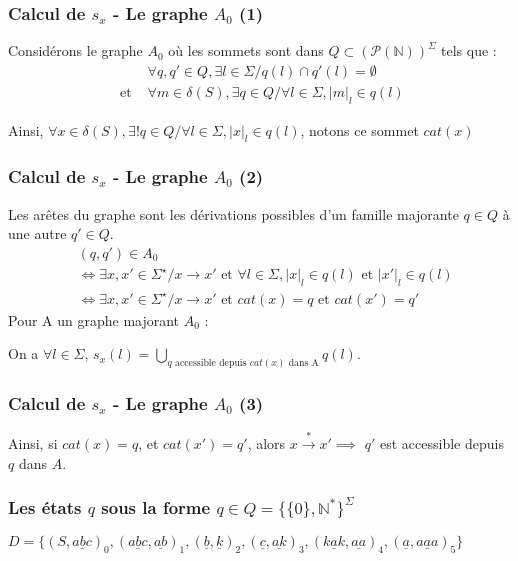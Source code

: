 \documentclass[12pt]{beamer}
\newcommand{\norm}[1]{\lvert #1 \rvert}
\begin{document}
\begin{frame}\frametitle{Calcul de $s_x$ - Le graphe $A_0$ (1)}
Considérons le graphe $A_0$ où les sommets sont dans 
$Q \subset ({\mathcal{P}(\mathbb{N})})^{\Sigma}$ tels que :
\begin{align*}
    &\forall q,q' \in Q, \exists l \in \Sigma / q(l) \cap q'(l) = \emptyset\\
    \text{ et }&\forall m \in \delta(S), \exists q \in Q / \forall l \in \Sigma, \norm{m}_l \in q(l)
\end{align*}

Ainsi, $\forall x \in \delta(S), \exists ! q \in Q / \forall l \in \Sigma, \norm{x}_l \in q(l)$, notons ce sommet $cat(x)$
\end{frame}

\begin{frame}\frametitle{Calcul de $s_x$ - Le graphe $A_0$ (2)}

Les arêtes du graphe sont les dérivations possibles d'un famille majorante $q \in Q$ à une autre $q' \in Q$.
\begin{align*}
    &(q,q') \in A_0 \\
    &\iff \exists x,x' \in \Sigma^\star / x \rightarrow x' \text{ et } \forall l \in \Sigma, \norm{x}_l \in q(l) \text{ et } \norm{x'}_l \in q(l)\\
    &\iff \exists x,x' \in \Sigma^\star / x \rightarrow x' \text{ et } cat(x) = q \text{ et } cat(x') = q'
\end{align*}
Pour A un graphe majorant $A_0$ : 

On a $\forall l \in \Sigma$, $s_x(l) = \bigcup_{q\text{ accessible depuis } cat(x) \text{ dans A}}q(l)$.
\end{frame}
\begin{frame}\frametitle{Calcul de $s_x$ - Le graphe $A_0$ (3)}
Ainsi, si $cat(x) = q$, et $cat(x')=q'$, alors $x \overset{*}{\rightarrow} x' \implies$ $q'$ est accessible depuis $q$ dans $A$. 

\end{frame}

\begin{frame}\frametitle{Les états $q$ sous la forme $q \in Q = \{\{0\},\mathbb{N}^*\}^{\Sigma}$}

$D = \{(S,\underline{ abc })_0,(\underline{ abc },\underline{ ab })_1,(\underline{ b },\underline{ k })_2,(\underline{ c },\underline{ ak })_3,(\underline{ kak },\underline{ aa })_4,(\underline{ a },\underline{ aaa })_5\}$

\begin{figure}
    \centering
    \qquad
\end{figure}

\end{frame}
\end{document}

